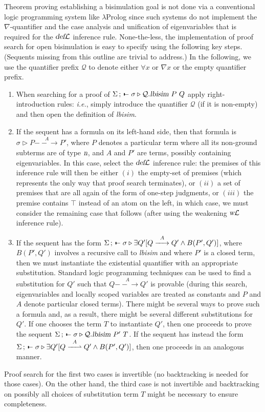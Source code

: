\documentclass{acmtrans2m}
\def\Qscr{{\mathcal Q}}
\def\relbar{\mathrel{\smash-}}
\def\joinrelm{\mathrel{\mkern-3.2mu}}
\def\tailpiece{\kern 1pt\vrule height 1ex width 0.3ex depth -.25ex}
\def\seqsym{\mathrel{\tailpiece\joinrelm\relbar}}
\newcommand{\Judg}[2]{#1\triangleright#2}
\newcommand{\NSeq}[3]{#1\,;\,#2 \seqsym #3}
\newcommand{\lbisim}[2]{\hbox{\sl lbisim}~#1~#2}
\newcommand{\defL}{\hbox{\sl def}{\cal L}}
\newcommand{\name}{\hbox{\sl n}}
\newcommand{\one  }[3]{#1\stackrel{#2}{-\!\!-\!\!\!\rightarrow    } #3}
\newcommand{\onep }[3]{#1\stackrel{#2}{-\!\!-\!\!\!\rightharpoonup} #3}
\newcommand{\wL}{\hbox{\sl w}{\cal L}}
\begin{document}
Theorem proving establishing a bisimulation goal is not done via a
conventional logic programming system like $\lambda$Prolog since such
systems do not implement the $\nabla$-quantifier and the case analysis
and unification of eigenvariables that is required for the $\defL$
inference rule.  None-the-less, the implementation of proof search for
open bisimulation is easy to specify using the following key steps.
(Sequents missing from this outline are trivial to address.)  In the
following, we use the quantifier prefix $\Qscr$ to denote either
$\forall x$ or $\nabla x$ or the empty quantifier prefix.
\begin{enumerate}

\item When searching for a proof of
$\NSeq{\Sigma}{}{\Judg{\sigma}{\Qscr.\lbisim{P}{Q}}}$ apply
right-introduction rules: {\em i.e.}, simply introduce the quantifier
$\Qscr$ (if it is non-empty) and then open the definition of
{\sl lbisim}.

\item If the sequent has a formula on its left-hand side, then that
formula is $\Judg{\sigma}{\one{P}{A}{P'}}$, where $P$ denotes a
particular term where all its non-ground subterms are of type $\name$, 
and $A$ and $P'$ are terms, possibly containing eigenvariables.  In this
case, select the $\defL$ inference rule: the premises of this
inference rule will then be either $(i)$ the empty-set of premises
(which represents the only way that proof search terminates), or
$(ii)$ a set of premises that are all again of the form of one-step
judgments, or $(iii)$
the premise contains $\top$ instead of an atom on the left, in which
case, we must consider the remaining case that follows (after using
the weakening $\wL$ inference rule).

\item If the sequent has the form
$\NSeq{\Sigma}{}{\Judg{\sigma}{\exists Q' [\one{Q}{A}{Q'}\land
B(P',Q')]}}$, where $B(P',Q')$ involves a recursive call to {\sl
lbisim} and where $P'$ is a closed term, then we must instantiate the
existential quantifier with an appropriate substitution.  Standard
logic programming techniques can be
used to find a substitution for $Q'$ such that $\one{Q}{A}{Q'}$ is
provable (during this search, eigenvariables and locally scoped
variables are treated as constants and $P$ and $A$ denote particular
closed terms).  There might be several ways to prove such a formula
and, as a result, there might be several different substitutions for
$Q'$.  If one chooses the term $T$ to instantiate $Q'$, then one proceeds
to prove the sequent
$\NSeq{\Sigma}{}{\Judg{\sigma}{\Qscr.\lbisim{P'}{T}}}$.  
If the sequent has instead the form $\NSeq{\Sigma}{}{\Judg{\sigma}{\exists Q'
[\onep{Q}{A}{Q'}\land B(P',Q')]}}$, then one proceeds in an analogous manner.
\end{enumerate}
Proof search for the first two cases is invertible (no backtracking is
needed for those cases).  On the other hand, the third
case is not invertible and backtracking on possibly all choices of
substitution term $T$ might be necessary to ensure completeness.
\end{document}
